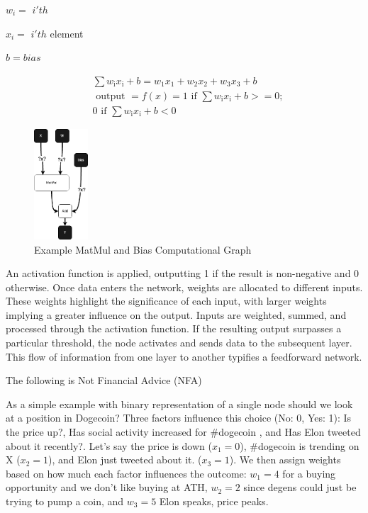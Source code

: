 \documentclass[conference]{IEEEtran}
\begin{document}
$w_i = $ $i'th$

$x_i = $  $i'th$ element

$b = bias$

$$\begin{aligned} & 
\sum w_{\mathrm{i}} x_{\mathrm{i}}+b=w_1 x_1+w_2 x_2+w_3 x_3+b \\ &
\text { output }=f(x)=1 \text { if } \sum w_{\mathrm{i}} x_{\mathrm{i}}+b>=0 ; \\ 
& 0 \text { if } \sum w_{\mathrm{i}} x_{\mathrm{i}}+b<0\end{aligned}$$

\begin{figure}[!ht]
    \centering
    \includegraphics[width=0.18\textwidth]{figures/ai-model-matmul.png}
    \caption{Example MatMul and Bias Computational Graph}
    \label{fig:Fig 2}
\end{figure}

An activation function is applied, outputting 1 if the result is non-negative and 0 otherwise. Once data enters the network, weights are allocated to different inputs. These weights highlight the significance of each input, with larger weights implying a greater influence on the output. Inputs are weighted, summed, and processed through the activation function. If the resulting output surpasses a particular threshold, the node activates and sends data to the subsequent layer. This flow of information from one layer to another typifies a feedforward network.

\noindent The following is Not Financial Advice (NFA)

As a simple example with binary representation of a single node should we look at a position in Dogecoin? Three factors influence this choice (No: 0, Yes: 1): Is the price up?, Has social activity increased for \#dogecoin , and Has Elon tweeted about it recently?. Let's say the price is down ($x_1 = 0$), \#dogecoin is trending on X ($x_2 = 1$), and Elon just tweeted about it. ($x_3 = 1$). We then assign weights based on how much each factor influences the outcome: $w_1 = 4$ for a buying opportunity and we don't like buying at ATH, $w_2 = 2$ since degens could just be trying to pump a coin, and $w_3 = 5$ Elon speaks, price peaks.
\end{document}
